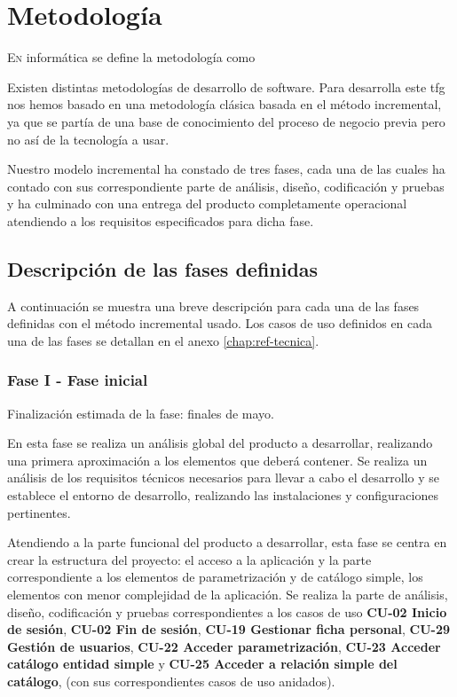 \chapter{Metodología}
\label{chap:metodologia}

\lettrine{E}{n} informática se define la metodología como 

Existen distintas metodologías de desarrollo de software. Para desarrolla este \acrshort{tfg} nos hemos basado en una metodología clásica basada en el método incremental, ya que se partía de una base de conocimiento del proceso de negocio previa pero no así de la tecnología a usar.

Nuestro modelo incremental ha constado de tres fases, cada una de las cuales ha contado con sus correspondiente parte de análisis, diseño, codificación y pruebas y ha culminado con una entrega del producto completamente operacional atendiendo a los requisitos especificados para dicha fase.

\section{Descripción de las fases definidas}
\label{sec:metodologia-fases}

A continuación se muestra una breve descripción para cada una de las fases definidas con el método incremental usado. Los casos de uso definidos en cada una de las fases se detallan en el anexo \ref{chap:ref-tecnica}.

\subsection{Fase I - Fase inicial}
Finalización estimada de la fase: finales de mayo.

En esta fase se realiza un análisis global del producto a desarrollar, realizando una primera aproximación a los elementos que deberá contener.
Se realiza un análisis de los requisitos técnicos necesarios para llevar a cabo el desarrollo y se establece el entorno de desarrollo, realizando las instalaciones y configuraciones pertinentes. 

Atendiendo a la parte funcional del producto a desarrollar, esta fase se centra en crear la estructura del proyecto: el acceso a la aplicación y la parte correspondiente a los elementos de parametrización y de catálogo simple, los elementos con menor complejidad de la aplicación. Se realiza la parte de análisis, diseño, codificación y pruebas correspondientes a los casos de uso \textbf{CU-02 Inicio de sesión}, \textbf{CU-02 Fin de sesión}, \textbf{CU-19 Gestionar ficha personal}, \textbf{CU-29 Gestión de usuarios}, \textbf{CU-22 Acceder parametrización}, \textbf{CU-23 Acceder catálogo entidad simple} y \textbf{CU-25 Acceder a relación simple del catálogo}, (con sus correspondientes casos de uso anidados). 


